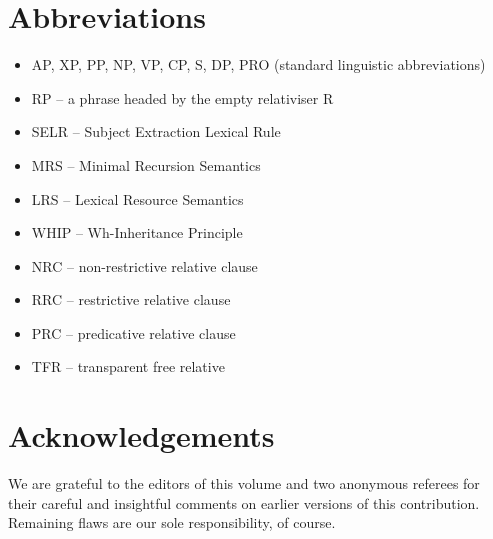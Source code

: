\documentclass[output=paper,nonflat,draftmode]{./langsci/langscibook}
\begin{document}

\section*{Abbreviations}
\begin{itemize}
\item AP, XP, PP, NP, VP, CP, S, DP, PRO (standard linguistic abbreviations)
\item RP -- a phrase headed by the empty relativiser R%
\item SELR -- Subject Extraction Lexical Rule
\item MRS -- Minimal Recursion Semantics
\item LRS -- Lexical Resource Semantics
\item WHIP --  Wh-Inheritance Principle
\item NRC -- non-restrictive relative clause
\item RRC -- restrictive relative clause
\item PRC -- predicative relative clause 
\item TFR -- transparent free relative
\end{itemize}

\section*{Acknowledgements}
We are grateful to the editors of this volume and two anonymous referees for their careful
and insightful comments on earlier versions of this contribution. Remaining flaws are our
sole responsibility, of course.


{\sloppy 
\printbibliography[heading=subbibliography,notkeyword=this] 
}
\end{document}

